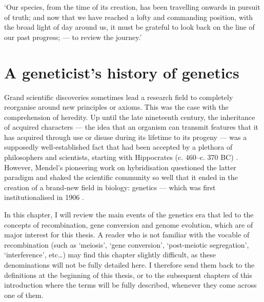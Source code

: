 \begin{savequote}[8cm]
‘Our species, from the time of its creation, has been travelling onwards in pursuit of truth; and now that we have reached a lofty and commanding position, with the broad light of day around us, it must be grateful to look back on the line of our past progress; — to review the journey.’
	
\end{savequote}

\chapter{\label{ch:1-history-genetics}A geneticist's history of genetics} 

\minitoc{}



Grand scientific discoveries sometimes lead a research field to completely reorganise around new principles or axioms. 
This was the case with the comprehension of heredity. 
Up until the late nineteenth century, the inheritance of acquired characters — the idea that an organism can transmit features that it has acquired through use or disuse during its lifetime to its progeny — was a supposedly well-established fact that had been accepted by a plethora of philosophers and scientists, starting with Hippocrates (c. 460--c. 370 BC) \citep{zirkle1935inheritance}.
However, Mendel's pioneering work on hybridisation questioned the latter paradigm and shaked the scientific community so well that it ended in the creation of a brand-new field in biology: genetics — which was first institutionalised in 1906 \citep{gayon2016mendel}.

In this chapter, I will review the main events of the genetics era that led to the concepts of recombination, gene conversion and genome evolution, which are of major interest for this thesis. %
A reader who is not familiar with the vocable of recombination (such as ‘meiosis’, ‘gene conversion’, ‘post-meiotic segregation’, ‘interference’, etc…) may find this chapter slightly difficult, as these denominations will not be fully detailed here. I therefore send them back to the definitions at the beginning of this thesis, or to the subsequent chapters of this introduction where the terms will be fully described, whenever they come across one of them.

